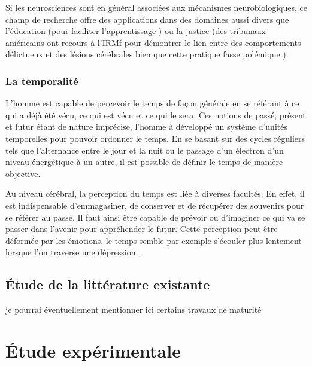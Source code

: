 \documentclass[12pt,fleqn,oneside]{book} %
\begin{document}
Si les neurosciences sont en général associées aux mécanismes neurobiologiques, ce champ de recherche offre des applications dans des domaines aussi divers que l'éducation (pour faciliter l'apprentissage \cite{pedagogie}) ou la justice (des tribunaux américains ont recours à l'IRMf pour démontrer le lien entre des comportements délictueux et des lésions cérébrales bien que cette pratique fasse polémique \cite{justice}).

\subsection[La temporalité]{La temporalité \cite{reptemps}}  %
L'homme est capable de percevoir le temps de façon générale en se référant à ce qui a déjà été vécu, ce qui est vécu et ce qui le sera. Ces notions de passé, présent et futur étant de nature imprécise, l'homme à développé un système d'unités temporelles pour pouvoir ordonner le temps. En se basant sur des cycles réguliers tels que l'alternance entre le jour et la nuit ou le passage d'un électron d'un niveau énergétique à un autre, il est possible de définir le temps de manière objective. 

Au niveau cérébral, la perception du temps est liée à diverses facultés. En effet, il est indispensable d'emmagasiner, de conserver et de récupérer des souvenirs pour se référer au passé. Il faut ainsi être capable de prévoir ou d'imaginer ce qui va se passer dans l'avenir pour appréhender le futur. Cette perception peut être déformée par les émotions, le temps semble par exemple s'écouler plus lentement lorsque l'on traverse une dépression \cite{emotiontemps}. 

\section{\'Etude de la littérature existante} 

\begin{remark}
je pourrai éventuellement mentionner ici certains travaux de maturité
\end{remark}



\chapter{\'Etude expérimentale}
\end{document}
